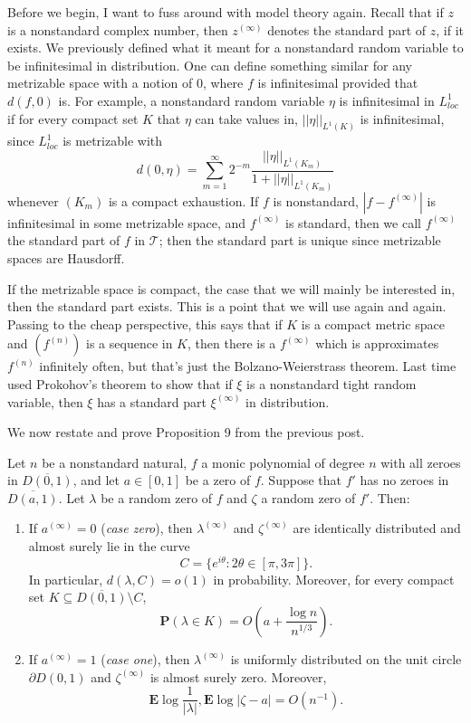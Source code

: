 \documentclass[12pt]{article}
\begin{document}

Before we begin, I want to fuss around with model theory again.
Recall that if $z$ is a nonstandard complex number, then $z^{(\infty)}$ denotes the standard part of $z$, if it exists.
We previously defined what it meant for a nonstandard random variable to be infinitesimal in distribution.
One can define something similar for any metrizable space with a notion of $0$, where $f$ is infinitesimal provided that $d(f, 0)$ is.
For example, a nonstandard random variable $\eta$ is infinitesimal in $L^1_{loc}$ if for every compact set $K$ that $\eta$ can take values in, $||\eta||_{L^1(K)}$ is infinitesimal, since $L^1_{loc}$ is metrizable with
$$d(0, \eta) = \sum_{m=1}^\infty 2^{-m} \frac{||\eta||_{L^1(K_m)}}{1 + ||\eta||_{L^1(K_m)}}$$
whenever $(K_m)$ is a compact exhaustion.
If $f$ is nonstandard, $|f - f^{(\infty)}|$ is infinitesimal in some metrizable space, and $f^{(\infty)}$ is standard, then we call $f^{(\infty)}$ the standard part of $f$ in $\mathcal T$; then the standard part is unique since metrizable spaces are Hausdorff.

If the metrizable space is compact, the case that we will mainly be interested in, then the standard part exists.
This is a point that we will use again and again. Passing to the cheap perspective, this says that if $K$ is a compact metric space and $(f^{(n)})$ is a sequence in $K$, then there is a $f^{(\infty)}$ which is approximates $f^{(n)}$ infinitely often, but that's just the Bolzano-Weierstrass theorem.
Last time used Prokohov's theorem to show that if $\xi$ is a nonstandard tight random variable, then $\xi$ has a standard part $\xi^{(\infty)}$ in distribution.

We now restate and prove Proposition 9 from the previous post.

\begin{theorem}
Let $n$ be a nonstandard natural, $f$ a monic polynomial of degree $n$ with all zeroes in $\overline{D(0, 1)}$, and let $a \in [0, 1]$ be a zero of $f$.
Suppose that $f'$ has no zeroes in $\overline{D(a, 1)}$.
Let $\lambda$ be a random zero of $f$ and $\zeta$ a random zero of $f'$. Then:
\begin{enumerate}
\item If $a^{(\infty)} = 0$ (\emph{case zero}), then $\lambda^{(\infty)}$ and $\zeta^{(\infty)}$ are identically distributed and almost surely lie in the curve
$$C = \{e^{i\theta}: 2\theta \in [\pi, 3\pi]\}.$$
In particular, $d(\lambda, C) = o(1)$ in probability.
Moreover, for every compact set $K \subseteq \overline{D(0, 1)} \setminus C$,
$$\mathbf P(\lambda \in K) = O\left(a + \frac{\log n}{n^{1/3}}\right).$$
\item If $a^{(\infty)} = 1$ (\emph{case one}), then $\lambda^{(\infty)}$ is uniformly distributed on the unit circle $\partial D(0, 1)$ and $\zeta^{(\infty)}$ is almost surely zero. Moreover,
$$\mathbf E \log \frac{1}{|\lambda|}, \mathbf E\log |\zeta - a| = O(n^{-1}).$$
\end{enumerate}
\end{theorem}
\end{document}
